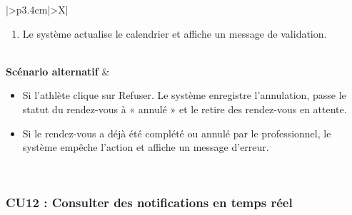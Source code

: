 ﻿\documentclass[a4paper,12pt]{report}
\begin{document}
\begin{table}[H]
\begin{tabularx}{\textwidth}{|>{\RaggedRight\arraybackslash}p{3.4cm}|>{\RaggedRight\arraybackslash}X|}
\begin{minipage}[t]{\linewidth}
\begin{enumerate}[label=\arabic*., leftmargin=*, topsep=0pt, itemsep=1pt]
    \item Le système actualise le calendrier et affiche un message de validation.
\end{enumerate}
\vspace{2pt}
\end{minipage} \\
\hline
\textbf{Scénario alternatif} &
\begin{minipage}[t]{\linewidth}\sloppy
\vspace{2pt}
\begin{itemize}[leftmargin=*, topsep=0pt, itemsep=1pt]
    \item  Si l'athlète clique sur Refuser. Le système enregistre l'annulation, passe le statut du rendez-vous à « annulé » et le retire des rendez-vous en attente.
    \item  Si le rendez-vous a déjà été complété ou annulé par le professionnel, le système empêche l'action et affiche un message d'erreur.
\end{itemize}
\vspace{2pt}
\end{minipage} \\
\hline
\end{tabularx}
\fussy
\end{table}
\endgroup
\begingroup

\subsubsection*{CU12 : Consulter des notifications en temps réel}
\end{document}
